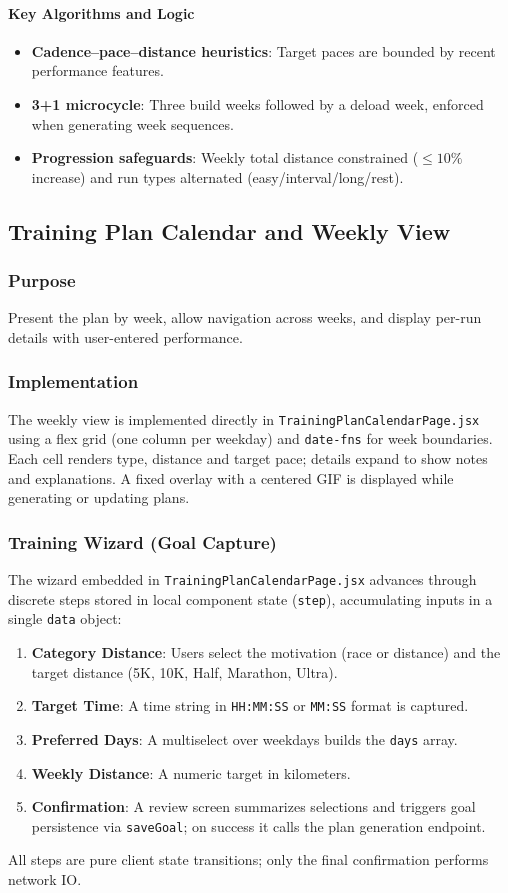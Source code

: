 \paragraph{Key Algorithms and Logic}
\begin{itemize}
  \item \textbf{Cadence–pace–distance heuristics}: Target paces are bounded by recent performance features.
  \item \textbf{3+1 microcycle}: Three build weeks followed by a deload week, enforced when generating week sequences.
  \item \textbf{Progression safeguards}: Weekly total distance constrained (\(\leq 10\%\) increase) and run types alternated (easy/interval/long/rest).
\end{itemize}

\subsection{Training Plan Calendar and Weekly View}
\subsubsection{Purpose}
Present the plan by week, allow navigation across weeks, and display per-run details with user-entered performance.

\subsubsection{Implementation}
The weekly view is implemented directly in \verb|TrainingPlanCalendarPage.jsx| using a flex grid (one column per weekday) and \verb|date-fns| for week boundaries. Each cell renders type, distance and target pace; details expand to show notes and explanations. A fixed overlay with a centered GIF is displayed while generating or updating plans.

\subsubsection{Training Wizard (Goal Capture)}
The wizard embedded in \verb|TrainingPlanCalendarPage.jsx| advances through discrete steps stored in local component state (\verb|step|), accumulating inputs in a single \verb|data| object:
\begin{enumerate}
  \item \textbf{Category \/ Distance}: Users select the motivation (race or distance) and the target distance (5K, 10K, Half, Marathon, Ultra).
  \item \textbf{Target Time}: A time string in \verb|HH:MM:SS| or \verb|MM:SS| format is captured.
  \item \textbf{Preferred Days}: A multi\-select over weekdays builds the \verb|days| array.
  \item \textbf{Weekly Distance}: A numeric target in kilometers.
  \item \textbf{Confirmation}: A review screen summarizes selections and triggers goal persistence via \verb|saveGoal|; on success it calls the plan generation endpoint.
\end{enumerate}
All steps are pure client state transitions; only the final confirmation performs network IO.

